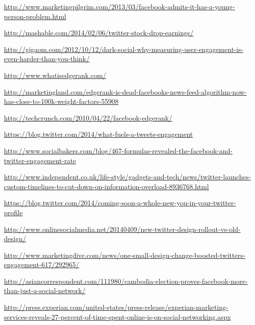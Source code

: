 
\begin{thebibliography}{9}

\url{http://www.marketingpilgrim.com/2013/03/facebook-admits-it-has-a-young-person-problem.html}

\url{http://mashable.com/2014/02/06/twitter-stock-drop-earnings/}

\url{http://gigaom.com/2012/10/12/dark-social-why-measuring-user-engagement-is-even-harder-than-you-think/}

\url{http://www.whatisedgerank.com/}

\url{http://marketingland.com/edgerank-is-dead-facebooks-news-feed-algorithm-now-has-close-to-100k-weight-factors-55908}

\url{http://techcrunch.com/2010/04/22/facebook-edgerank/}


\url{https://blog.twitter.com/2014/what-fuels-a-tweets-engagement}

\url{http://www.socialbakers.com/blog/467-formulas-revealed-the-facebook-and-twitter-engagement-rate}


\url{http://www.independent.co.uk/life-style/gadgets-and-tech/news/twitter-launches-custom-timelines-to-cut-down-on-information-overload-8936768.html}

\url{https://blog.twitter.com/2014/coming-soon-a-whole-new-you-in-your-twitter-profile}

\url{http://www.onlinesocialmedia.net/20140409/new-twitter-design-rollout-vs-old-design/}

\url{http://www.marketingdive.com/news/one-small-design-change-boosted-twitters-engagement-617/292965/}


\url{http://asiancorrespondent.com/111980/cambodia-election-proves-facebook-more-than-just-a-social-network/}

\url{http://press.experian.com/united-states/press-release/experian-marketing-services-reveals-27-percent-of-time-spent-online-is-on-social-networking.aspx}


\end{thebibliography}
